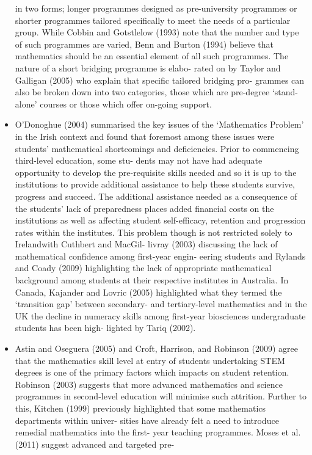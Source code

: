 \documentclass[twoside,12pt,a4paper]{report}
\begin{document}
\begin{itemize}
in two forms; longer programmes designed as pre-university programmes or shorter
programmes tailored specifically to meet the needs of a particular group. While
Cobbin and Gotstlelow (1993) note that the number and type of such programmes
are varied, Benn and Burton (1994) believe that mathematics should be an essential
element of all such programmes. The nature of a short bridging programme is elabo-
rated on by Taylor and Galligan (2005) who explain that specific tailored bridging pro-
grammes can also be broken down into two categories, those which are pre-degree
‘stand-alone’ courses or those which offer on-going support. 
	\item O’Donoghue (2004) summarised the key issues of the ‘Mathematics Problem’ in the
Irish context and found that foremost among these issues were students’ mathematical
shortcomings and deficiencies. Prior to commencing third-level education, some stu-
dents may not have had adequate opportunity to develop the pre-requisite skills
needed and so it is up to the institutions to provide additional assistance to help
these students survive, progress and succeed. The additional assistance needed as a
consequence of the students’ lack of preparedness places added financial costs on
the institutions as well as affecting student self-efficacy, retention and progression
rates within the institutes.
This problem though is not restricted solely to Irelandwith Cuthbert and MacGil-
livray (2003) discussing the lack of mathematical confidence among first-year engin-
eering students and Rylands and Coady (2009) highlighting the lack of appropriate
mathematical background among students at their respective institutes in Australia.
In Canada, Kajander and Lovric (2005) highlighted what they termed the ‘transition
gap’ between secondary- and tertiary-level mathematics and in the UK the decline in
numeracy skills among first-year biosciences undergraduate students has been high-
lighted by Tariq (2002).
	\item Astin and Oseguera (2005) and Croft, Harrison, and Robinson (2009) agree
that the mathematics skill level at entry of students undertaking STEM degrees
is one of the primary factors which impacts on student retention. Robinson
(2003) suggests that more advanced mathematics and science programmes in
second-level education will minimise such attrition. Further to this, Kitchen
(1999) previously highlighted that some mathematics departments within univer-
sities have already felt a need to introduce remedial mathematics into the first-
year teaching programmes. Moses et al. (2011) suggest advanced and targeted pre-

\end{itemize}
\end{document}
